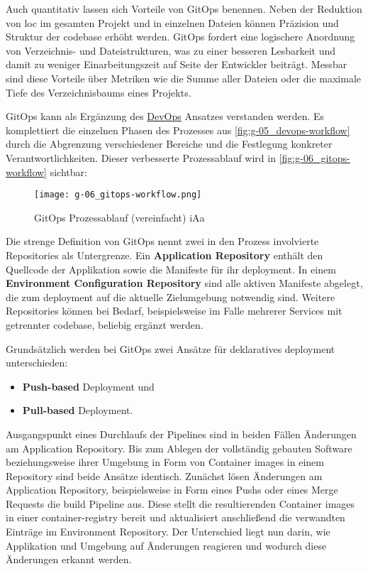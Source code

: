 Auch quantitativ lassen sich Vorteile von GitOps benennen. Neben der Reduktion von \Gls{loc} im gesamten Projekt und in einzelnen Dateien können Präzision und Struktur der \Gls{codebase} erhöht werden. GitOps fordert eine logischere Anordnung von Verzeichnis- und Dateistrukturen, was zu einer besseren Lesbarkeit und damit zu weniger Einarbeitungszeit auf Seite der Entwickler beiträgt. Messbar sind diese Vorteile über Metriken wie die Summe aller Dateien oder die maximale Tiefe des Verzeichnisbaums eines Projekts. \cite{008:GitOps-Approach-to-Cloud-Cluster-System-Deployment}

GitOps kann als Ergänzung des \hyperref[sec:03-01_introduction-to-devops]{DevOps} Ansatzes verstanden werden. Es komplettiert die einzelnen Phasen des Prozesses aus \autoref{fig:g-05_devops-workflow} durch die Abgrenzung verschiedener Bereiche und die Festlegung konkreter Verantwortlichkeiten. Dieser verbesserte Prozessablauf wird in \autoref{fig:g-06_gitops-workflow} sichtbar:

\begin{figure}[h]
    \centering
    \texttt{[image: g-06\_gitops-workflow.png]}
    \caption{GitOps Prozessablauf (vereinfacht) \acrshort{iAa} \citeauthor{008:GitOps-Approach-to-Cloud-Cluster-System-Deployment}}
    \label{fig:g-06_gitops-workflow}
\end{figure}

Die strenge Definition von GitOps nennt zwei in den Prozess involvierte Repositories als Untergrenze. Ein \textbf{Application Repository} enthält den Quellcode der Applikation sowie die Manifeste für ihr \Gls{deployment}. In einem \textbf{Environment Configuration Repository} sind alle aktiven Manifeste abgelegt, die zum \Gls{deployment} auf die aktuelle Zielumgebung notwendig sind. Weitere Repositories können bei Bedarf, beispielsweise im Falle mehrerer Services mit getrennter \Gls{codebase}, beliebig ergänzt werden. \cite{109:GitOps}

Grundsätzlich werden bei GitOps zwei Ansätze für deklaratives \Gls{deployment} unterschieden:

\begin{itemize}
    \item \textbf{Push-based} Deployment und
    \item \textbf{Pull-based} Deployment.
\end{itemize}

Ausgangspunkt eines Durchlaufs der Pipelines sind in beiden Fällen Änderungen am Application Repository. Bis zum Ablegen der vollständig gebauten Software beziehungsweise ihrer Umgebung in Form von Container \Glspl{image} in einem Repository sind beide Ansätze identisch. Zunächst lösen Änderungen am Application Repository, beispielsweise in Form eines Pushs oder eines Merge Requests die \Gls{build} Pipeline aus. Diese stellt die resultierenden Container \Glspl{image} in einer \Gls{container-registry} bereit und aktualisiert anschließend die verwandten Einträge im Environment Repository. \cite{007:Analysis-of-Declarative-and-Pull-based-Deployment-Models-on-GitOps} Der Unterschied liegt nun darin, wie Applikation und Umgebung auf Änderungen reagieren und wodurch diese Änderungen erkannt werden.

